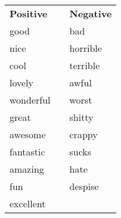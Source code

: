 \begin{tabular}{|l|l|l|} \cline{1-1}\cline{3-3}
\textbf{Positive} & \textbf{} & \textbf{Negative} \\ \cline{1-1}\cline{3-3}
good &  & bad \\ \cline{1-1}\cline{3-3}
nice &  & horrible \\ \cline{1-1}\cline{3-3}
cool &  & terrible \\ \cline{1-1}\cline{3-3}
lovely &  & awful \\ \cline{1-1}\cline{3-3}
wonderful &  & worst \\ \cline{1-1}\cline{3-3}
great &  & shitty \\ \cline{1-1}\cline{3-3}
awesome &  & crappy \\ \cline{1-1}\cline{3-3}
fantastic &  & sucks \\ \cline{1-1}\cline{3-3}
amazing &  & hate \\ \cline{1-1}\cline{3-3}
fun &  & despise \\ \cline{1-1}\cline{3-3}
excellent & \multicolumn{2}{c}{} \\ \cline{1-1}\cline{3-3}
\end{tabular}